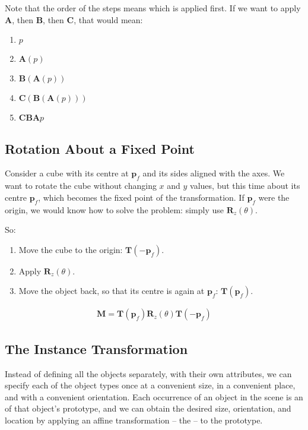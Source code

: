 \documentclass[../COS3712_Notes.tex]{subfiles}
\begin{document}
      Note that the order of the steps means which is applied first.
      If we want to apply $\mathbf{A}$, then $\mathbf{B}$, then $\mathbf{C}$,
      that would mean:
      \begin{enumerate}[nosep]
        \item $p$
        \item $\mathbf{A}(p)$
        \item $\mathbf{B}(\mathbf{A}(p))$
        \item $\mathbf{C}(\mathbf{B}(\mathbf{A}(p)))$
        \item $\mathbf{CBA}p$
      \end{enumerate}

      \subsection{Rotation About a Fixed Point}
        \begin{example}
          Consider a cube with its centre at $\mathbf{p}_f$ and its sides aligned with the axes.
          We want to rotate the cube without changing $x$ and $y$ values,
          but this time about its centre $\mathbf{p}_f$, which becomes the fixed point
          of the transformation.
          If $\mathbf{p}_f$ were the origin, we would know how to solve the problem:
          simply use $\mathbf{R}_z(\theta)$.

          So:
          \begin{enumerate}[nosep]
            \item Move the cube to the origin: $\mathbf{T}(-\mathbf{p}_f)$.
            \item Apply $\mathbf{R}_z(\theta)$.
            \item Move the object back, so that its centre is again at $\mathbf{p}_f$:
              $\mathbf{T}(\mathbf{p}_f)$.
          \end{enumerate}
          \begin{align*}
            \mathbf{M} = \mathbf{T}(\mathbf{p}_f)\mathbf{R}_z(\theta)\mathbf{T}(-\mathbf{p}_f)
          \end{align*}
        \end{example}

      \subsection{The Instance Transformation}
        Instead of defining all the objects separately, with their own attributes,
        we can specify each of the object types once at a convenient size, in a convenient
        place, and with a convenient orientation.
        Each occurrence of an object in the scene is an  of that object's
        prototype, and we can obtain the desired size, orientation, and location
        by applying an affine transformation -- the  --
        to the prototype.
\end{document}
